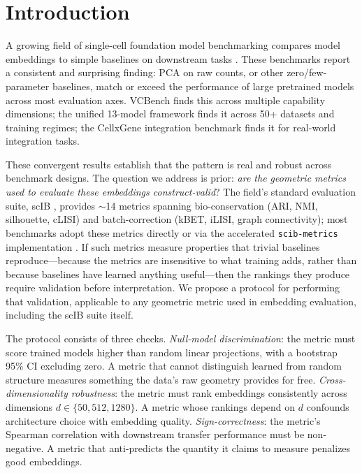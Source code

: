 \documentclass[10pt,letterpaper]{article}
\begin{document}
\section{Introduction}

A growing field of single-cell foundation model benchmarking compares model embeddings to simple baselines on downstream tasks \citep{luecken2022scib, wu2025scfm, vcbench2026, unifiedscfm2026, cellxgeneintegration2026}. These benchmarks report a consistent and surprising finding: PCA on raw counts, or other zero/few-parameter baselines, match or exceed the performance of large pretrained models across most evaluation axes. VCBench \citep{vcbench2026} finds this across multiple capability dimensions; the unified 13-model framework \citep{unifiedscfm2026} finds it across 50+ datasets and training regimes; the CellxGene integration benchmark \citep{cellxgeneintegration2026} finds it for real-world integration tasks.

These convergent results establish that the pattern is real and robust across benchmark designs. The question we address is prior: \emph{are the geometric metrics used to evaluate these embeddings construct-valid}? The field's standard evaluation suite, scIB \citep{luecken2022scib}, provides $\sim$14 metrics spanning bio-conservation (ARI, NMI, silhouette, cLISI) and batch-correction (kBET, iLISI, graph connectivity); most benchmarks adopt these metrics directly or via the accelerated \texttt{scib-metrics} implementation \citep{scibmetrics2023}. If such metrics measure properties that trivial baselines reproduce---because the metrics are insensitive to what training adds, rather than because baselines have learned anything useful---then the rankings they produce require validation before interpretation. We propose a protocol for performing that validation, applicable to any geometric metric used in embedding evaluation, including the scIB suite itself.

The protocol consists of three checks. \emph{Null-model discrimination}: the metric must score trained models higher than random linear projections, with a bootstrap 95\% CI excluding zero. A metric that cannot distinguish learned from random structure measures something the data's raw geometry provides for free. \emph{Cross-dimensionality robustness}: the metric must rank embeddings consistently across dimensions $d \in \{50, 512, 1280\}$. A metric whose rankings depend on $d$ confounds architecture choice with embedding quality. \emph{Sign-correctness}: the metric's Spearman correlation with downstream transfer performance must be non-negative. A metric that anti-predicts the quantity it claims to measure penalizes good embeddings.
\end{document}
